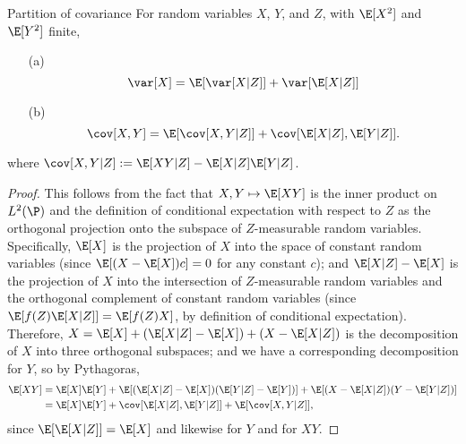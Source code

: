 

\begin{lemma}{Partition of covariance} \label{lem:covariance}
  For random variables $X$, $Y$, and $Z$, with $\E[X^2]$ and $\E[Y^2]$ finite,
  \begin{itemize}
    \item[(a)]
    \[
      \var[X] = \E[ \var[X|Z] ] + \var[ \E[X|Z] ]
    \]
    \item[(b)]
    \[
      \cov[X,Y] = \E[ \cov[X,Y|Z] ] + \cov[ \E[X|Z], \E[Y|Z] ] .
    \]
  \end{itemize}
  where $\cov[X,Y|Z] := \E[XY|Z] - \E[X|Z]\E[Y|Z]$.
\end{lemma}

\begin{proof}
This follows from the fact that $X,Y \mapsto \E[XY]$ is the inner product on $L^2(\P)$
and the definition of conditional expectation with respect to $Z$ as the orthogonal projection
onto the subspace of $Z$-measurable random variables.
Specifically, $\E[X]$ is the projection of $X$ into the space of constant random variables (since $\E[ (X-\E[X]) c ] = 0$ for any constant $c$);
and $\E[X|Z]-\E[X]$ is the projection of $X$ into the intersection of $Z$-measurable random variables and the orthogonal complement of constant random variables
(since $\E[ f(Z) \E[X|Z] ] = \E[ f(Z) X ]$, by definition of conditional expectation).
Therefore, $X = \E[X] + ( \E[X|Z] - \E[X] ) + ( X - \E[X|Z] )$
is the decomposition of $X$ into three orthogonal subspaces;
and we have a corresponding decomposition for $Y$,
so by Pythagoras,
\begin{align}
  \E[XY] &= \E[X]\E[Y] + \E[ (\E[X|Z] - \E[X])(\E[Y|Z] - \E[Y]) ] + \E[ (X - \E[X|Z])(Y - \E[Y|Z]) ]  \\
  &= \E[X]\E[Y] + \cov[ \E[X|Z], \E[Y|Z] ] + \E[ \cov[X,Y|Z] ] ,
\end{align}
since $\E[\E[X|Z]] = \E[X]$ and likewise for $Y$ and for $XY$.
\end{proof}



